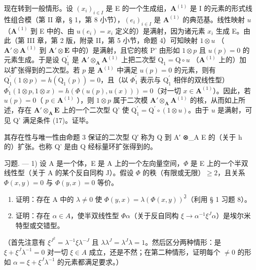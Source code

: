 现在转到一般情形。设 \((x_{i})_{i\in I}\) 是 E 的一个生成组，\(\mathbf{A}^{(1)}\) 是 I 的元素的形式线性组合模（第 II 章，§ 1，第 8 小节），\((e_{i})_{i\in I}\) 是 \(\mathbf{A}^{(1)}\) 的典范基。线性映射 \(u\) （\(\mathbf{A}^{(1)}\) 到 E 中的、由 \(u(e_{i}) = x_{i}\) 定义的）是满射，因为诸元素 \(x_{i}\) 生成 E。由此（第 III 章，第 2 版，附录 II，第 5 小节，命题 4）可知映射 \(1\otimes u\) （\(\mathbf{A}'\otimes\mathbf{A}^{(1)}\) 到 \(\mathbf{A}'\otimes\mathbf{E}\) 中的）是满射，且它的核 P' 由形如 \(1\otimes p\) 且 \(u(p)=0\) 的元素生成。于是设 \(\mathrm{Q}_{1}^{\prime}\) 是 \(\mathbf{A}'\otimes_{\mathbf{A}}\mathbf{A}^{(1)}\) 上把二次型 \(\mathrm{Q}_{1}=\mathrm{Q}\circ u\) （\(\mathbf{A}^{(1)}\) 上的）加以扩张得到的二次型。若 \(p\) 是 \(\mathbf{A}^{(1)}\) 中满足 \(u(p)=0\) 的元素，则有 \(\mathrm{Q}_{1}^{\prime}(1\otimes p)=h(\mathrm{Q}_{1}(p))=0\)，且（以 \(\Phi_{1}^{\prime}\) 表示与 \(\mathrm{Q}_{1}^{\prime}\) 相伴的双线性型）\(\Phi_{1}^{\prime}(1\otimes p,1\otimes x)=h(\Phi(u(p),u(x)))=0\)（对一切 \(x\in\mathbf{A}^{(1)}\)）。因此，若 \(u(p)=0\)（ \(p\in\mathbf{A}^{(1)}\) ），则 \(1\otimes p\) 属于二次模 \(\mathbf{A}'\otimes_{\mathbf{A}}\mathbf{A}^{(1)}\) 的核，从而如上所述，存在 \(\mathbf{A}'\otimes_{\mathbf{A}}\mathbf{E}\) 上的一个二次型 Q' 使 \(\mathrm{Q}_{1}^{\prime}=\mathrm{Q}^{\prime}\circ(1\otimes u)\)。由于 \(u\) 是满射，可见 Q' 满足条件 (17)。证毕。

其存在性与唯一性由命题 3 保证的二次型 Q′ 称为 Q 到 A′ ⊗\_A E 的（关于 h 的）扩张。也称 Q' 是由 Q 经标量环扩张得到的。

习题. — 1) 设 A 是一个体，E 是 A 上的一个左向量空间，\(\Phi\) 是 E 上的一个半双线性型（关于 A 的某个反自同构 J）。假设 \(\Phi\) 的秩（有限或无限）\(\geqslant 2\)，且关系 \(\Phi(x, y) = 0\) 与 \(\Phi(y, x) = 0\) 等价。

\begin{enumerate}
\def\labelenumi{\alph{enumi})}
\item
  证明：存在 A 中的 \(\lambda\neq0\) 使 \(\Phi(y,x)=\lambda(\Phi(x,y))^{\mathfrak{J}}\)（利用 § 1 习题 8）。
\item
  证明：存在 \(\alpha\in A\)，使半双线性型 \(\Phi\alpha\)（关于反自同构 \(\xi\to\alpha^{-1}\xi^{J}\alpha\)）是埃尔米特型或交错型。
\end{enumerate}

（首先注意有 \(\xi^{J^2} = \lambda^{-1}\xi\lambda^{-J}\) 且 \(\lambda\lambda^J = \lambda^J\lambda = 1\)。然后区分两种情形：是 \(\xi + \xi^J\lambda^{-1} = 0\) 对一切 \(\xi \in A\) 成立，还是不然；在第二种情形，证明每个 \(\neq 0\) 的形如 \(\alpha = \xi + \xi^J\lambda^{-1}\) 的元素都满足要求。）

